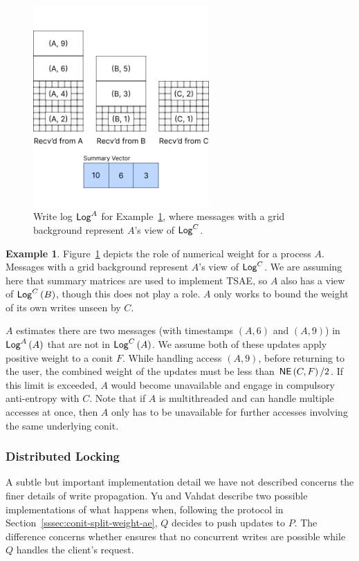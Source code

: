 \documentclass[]             %
{NASA}                       %
\theoremstyle{definition}
\newtheorem{example}[theorem]{Example}
\begin{document}
\begin{figure}
  \centering
  \includegraphics[width=0.6\textwidth]{images/conit/Numerical1.png}
  \caption{Write log $\mathsf{Log}^{A}$ for Example~\ref{ex:conit-numerical}, where
    messages with a grid background represent $A$'s view of $\mathsf{Log}^{C}$.}
  \label{fig:conit-numerical}
\end{figure}

\begin{example}
  \label{ex:conit-numerical}
  Figure~\ref{fig:conit-numerical} depicts the role of numerical
  weight for a process $A$.  Messages with a grid background represent
  $A$'s view of $\mathsf{Log}^{C}$. We are assuming here that summary matrices
  are used to implement TSAE, so $A$ also has a view of $\mathsf{Log}^{C}\left(B\right)$,
  though this does not play a role. $A$ only works to bound the weight
  of its own writes unseen by $C$.

  $A$ estimates there are two messages (with timestamps $(A, 6)$ and
  $(A, 9)$) in $\mathsf{Log}^{A}\left(A\right)$ that are not in $\mathsf{Log}^{C}\left(A\right)$. We assume
  both of these updates apply positive weight to a conit $F$. While
  handling access $(A, 9)$, before returning to the user, the combined
  weight of the updates must be less than
  \mbox{$\mathsf{NE}\left(C, F \right)/ 2$}. If this limit is exceeded, $A$
  would become unavailable and engage in compulsory anti-entropy with
  $C$. Note that if $A$ is multithreaded and can handle multiple
  accesses at once, then $A$ only has to be unavailable for further
  accesses involving the same underlying conit.
\end{example}

\subsubsection{Distributed Locking}
\label{sssec:conit-distributed-locking}
A subtle but important implementation detail we have not described
concerns the finer details of write propagation. Yu and Vahdat
describe two possible implementations of what happens when, following
the protocol in Section~\ref{sssec:conit-split-weight-ae}, $Q$ decides
to push updates to $P$. The difference concerns whether ensures that
no concurrent writes are possible while $Q$ handles the client's
request.
\end{document}
